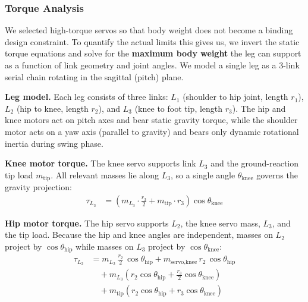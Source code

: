 
\subsubsection{Torque Analysis}

We selected high-torque servos so that body weight does not become a binding design constraint.
To quantify the actual limits this gives us, we invert the
static torque equations and solve for the \textbf{maximum body weight} the leg can support as a function of link geometry and joint angles.
We model a single leg as a 3-link serial chain rotating in the sagittal (pitch) plane.


\vspace{0.5cm}
\textbf{Leg model.}
Each leg consists of three links: $L_1$ (shoulder to hip joint, length $r_1$),
$L_2$ (hip to knee, length $r_2$), and $L_3$ (knee to foot tip, length $r_3$).
The hip and knee motors act on pitch axes and bear static gravity torque, while
the shoulder motor acts on a yaw axis (parallel to gravity) and bears only
dynamic rotational inertia during swing phase.

\vspace{0.5cm}
\textbf{Knee motor torque.}
The knee servo supports link $L_3$ and the ground-reaction tip load $m_{\text{tip}}$.
All relevant masses lie along $L_3$, so a single angle $\theta_{\text{knee}}$
governs the gravity projection:
%
\begin{align*}
  \tau_{L_3}
  &= \left( m_{L_3} \cdot \frac{r_3}{2}
  + m_{\text{tip}} \cdot r_3 \right)
  \cos\theta_{\text{knee}}
\end{align*}

\textbf{Hip motor torque.}
The hip servo supports $L_2$, the knee servo mass, $L_3$, and the tip load.
Because the hip and knee angles are independent, masses on $L_2$ project by
$\cos\theta_{\text{hip}}$ while masses on $L_3$ project by
$\cos\theta_{\text{knee}}$:
%
\begin{align*}
  \tau_{L_2}
  &= m_{L_2}\,\frac{r_2}{2}\,\cos\theta_{\text{hip}}
  + m_{\text{servo,knee}}\,r_2\,\cos\theta_{\text{hip}} \\
  &\quad + m_{L_3}\!\left(r_2\cos\theta_{\text{hip}}
  + \frac{r_3}{2}\cos\theta_{\text{knee}}\right) \\
  &\quad + m_{\text{tip}}\!\left(r_2\cos\theta_{\text{hip}}
  + r_3\cos\theta_{\text{knee}}\right)
\end{align*}

